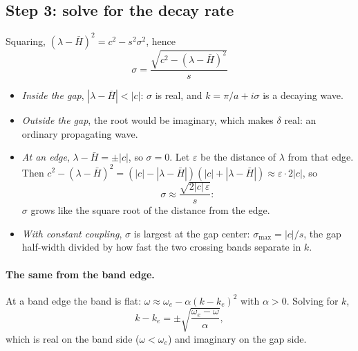 \subsection{Step 3: solve for the decay rate}
Squaring, $(\lambda - \bar{H})^2 = c^2 - s^2\sigma^2$, hence
\begin{equation}
  \boxed{\;\sigma = \frac{\sqrt{c^2 - (\lambda - \bar{H})^2}}{s}\;}
  \label{eq:sigma_two_level}
\end{equation}
\begin{itemize}
  \item \emph{Inside the gap}, $|\lambda - \bar{H}| < |c|$: $\sigma$ is real, and
        $k = \pi/a + i\sigma$ is a decaying wave.
  \item \emph{Outside the gap}, the root would be imaginary, which makes $\delta$ real:
        an ordinary propagating wave.
  \item \emph{At an edge}, $\lambda - \bar{H} = \pm|c|$, so $\sigma = 0$. Let
        $\varepsilon$ be the distance of $\lambda$ from that edge. Then
        $c^2 - (\lambda - \bar{H})^2 = (|c| - |\lambda - \bar{H}|)(|c| + |\lambda - \bar{H}|)
        \approx \varepsilon\cdot 2|c|$, so
        \begin{equation}
          \sigma \approx \frac{\sqrt{2|c|\,\varepsilon}}{s} :
        \end{equation}
        $\sigma$ grows like the square root of the distance from the edge.
  \item \emph{With constant coupling}, $\sigma$ is largest at the gap center:
        $\sigma_\mathrm{max} = |c|/s$, the gap half-width divided by how fast the two
        crossing bands separate in $k$.
\end{itemize}

\paragraph{The same from the band edge.} At a band edge the band is flat:
$\omega \approx \omega_e - \alpha(k - k_e)^2$ with $\alpha > 0$. Solving for $k$,
\begin{equation}
  k - k_e = \pm\sqrt{\frac{\omega_e - \omega}{\alpha}},
\end{equation}
which is real on the band side ($\omega < \omega_e$) and imaginary on the gap side.

